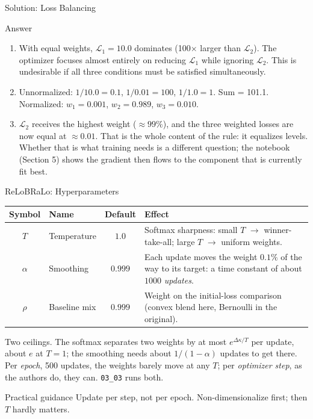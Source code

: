 \documentclass[aspectratio=169,11pt]{beamer}
\newcommand{\emphc}[1]{\textcolor{harvardcrimson}{#1}}
\begin{document}
\begin{frame}{Solution: Loss Balancing}
\begin{block}{Answer}
\begin{enumerate}
    \item With equal weights, $\mathcal{L}_1 = 10.0$ dominates (100$\times$ larger than $\mathcal{L}_2$). The optimizer focuses almost entirely on reducing $\mathcal{L}_1$ while ignoring $\mathcal{L}_2$. This is undesirable if all three conditions must be satisfied simultaneously.
    \item Unnormalized: $1/10.0 = 0.1$, $1/0.01 = 100$, $1/1.0 = 1$. Sum = 101.1.\\
    Normalized: $w_1 = 0.001$, $w_2 = 0.989$, $w_3 = 0.010$.
    \item $\mathcal{L}_2$ receives the highest weight ($\approx 99\%$), and the three weighted losses are now equal at $\approx 0.01$. That is the whole content of the rule: it equalizes levels. Whether that is what training needs is a different question; the notebook (Section 5) shows the gradient then flows to the component that is currently fit best.
\end{enumerate}
\end{block}
\end{frame}

\begin{frame}{ReLoBRaLo: Hyperparameters}
\small
\begin{center}
\vspace{-0.2cm}
\footnotesize
\renewcommand{\arraystretch}{1.2}
\begin{tabular}{@{}c l c p{6.2cm}@{}}
\toprule
\textbf{Symbol} & \textbf{Name} & \textbf{Default} & \textbf{Effect} \\
\midrule
$T$      & Temperature   & $1.0$   & Softmax sharpness: small $T$ $\to$ winner-take-all; large $T$ $\to$ uniform weights. \\
$\alpha$ & Smoothing     & $0.999$ & Each update moves the weight $0.1\%$ of the way to its target: a time constant of about $1000$ \emph{updates}. \\
$\rho$   & Baseline mix  & $0.999$ & Weight on the initial-loss comparison (convex blend here, Bernoulli in the original). \\
\bottomrule
\end{tabular}
\end{center}

\vspace{0.25cm}
{\footnotesize \emphc{Two ceilings.} The softmax separates two weights by at most $e^{\Delta\kappa/T}$ per update, about $e$ at $T=1$; the smoothing needs about $1/(1-\alpha)$ updates to get there. Per \emph{epoch}, 500 updates, the weights barely move at any $T$; per \emph{optimizer step}, as the authors do, they can. \texttt{03\_03} runs both.}

\vspace{0.15cm}
\begin{block}{Practical guidance}
Update per step, not per epoch. Non-dimensionalize first; then $T$ hardly matters.
\end{block}
\end{frame}
\end{document}
